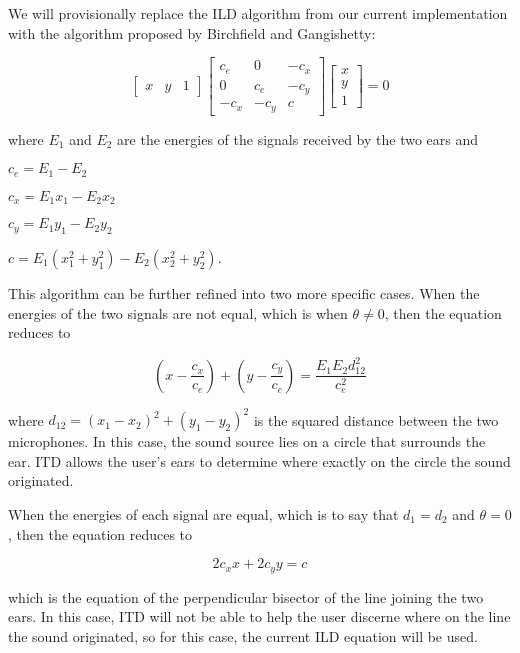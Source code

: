 \documentclass[12pt, letterpaper, draft]{article}
\begin{document}
We will provisionally replace the ILD algorithm from our current
implementation with the algorithm proposed by Birchfield and Gangishetty:

\begin{equation}
\left[ \begin{array}{ccc} x & y & 1 \end{array} \right] \left[ \begin{array}{ccc}
    c_{e} & 0 & -c_{x} \\ 0 & c_{e} & -c_{y} \\ -c_{x} & -c_{y} &
    c \end{array}\right] \left[ \begin{array}{c} x \\ y
    \\ 1 \end{array} \right] = 0
\end{equation}

where $E_{1}$ and $E_{2}$ are the energies of the signals received by the two ears and

$c_{e} = E_{1} - E_{2}$

$c_{x} = E_{1}x_{1} - E_{2}x_{2}$

$c_{y} = E_{1}y_{1} - E_{2}y_{2}$

$c = E_{1}(x^{2}_{1} + y^{2}_{1}) - E_{2}(x^{2}_{2} + y^{2}_{2})$.


This algorithm can be further refined into two more specific cases.
When the energies of the two signals are not equal, which is when
$\theta \neq 0$, then the equation reduces to 

\begin{equation}
(x - \frac{c_{x}}{c_{e}}) + (y - \frac{c_{y}}{c_{e}}) =
  \frac{E_{1}E_{2}d^{2}_{12}}{c^{2}_{e}}
\end{equation}

where $d_{12} = (x_{1} - x_{2})^{2} + (y_{1} - y_{2})^{2}$ is the
squared distance between the two microphones. In this case, the sound
source lies on a circle that surrounds the ear. ITD allows the user's
ears to determine where exactly on the circle the sound originated.

When the energies of each signal are equal, which is to say that
$d_{1} = d_{2}$ and $\theta = 0$, then the equation reduces to

\begin{equation}
2c_{x}x + 2c_{y}y = c
\end{equation}

which is the equation of the perpendicular bisector of the line
joining the two ears. In this case, ITD will not be able to help the
user discerne where on the line the sound originated, so for this
case, the current ILD equation will be used.
\end{document}
